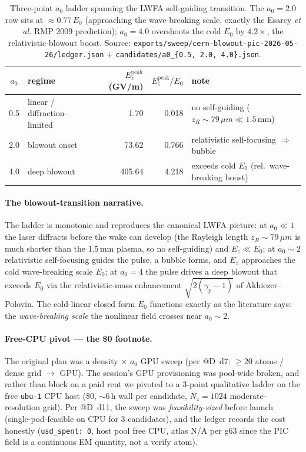 \begin{table}[h]
\centering
\small
\setlength{\tabcolsep}{6pt}
\begin{tabular}{@{}c l r r l@{}}
\toprule
$a_0$ & regime & $E_z^{\text{peak}}$ (GV/m) & $E_z^{\text{peak}}/E_0$ & note \\
\midrule
0.5 & linear / diffraction-limited & 1.70   & 0.018 & no self-guiding ($z_R\!\sim\!79\,\mu m\ll\!1.5$\,mm) \\
2.0 & blowout onset                & 73.62  & 0.766 & relativistic self-focusing $\Rightarrow$ bubble \\
4.0 & deep blowout                 & 405.64 & 4.218 & exceeds cold $E_0$ (rel.\ wave-breaking boost) \\
\bottomrule
\end{tabular}
\caption{Three-point $a_0$ ladder spanning the LWFA self-guiding
transition. The $a_0\!=\!2.0$ row sits at $\approx\!0.77\,E_0$
(approaching the wave-breaking scale, exactly the Esarey \emph{et al.}
RMP 2009 prediction); $a_0\!=\!4.0$ overshoots the cold $E_0$ by
$4.2\times$, the relativistic-blowout boost. Source:
\texttt{exports/sweep/cern-blowout-pic-2026-05-26/ledger.json} +
\texttt{candidates/a0\_\{0.5, 2.0, 4.0\}.json}.}
\label{tab:app-wf-blowout}
\end{table}

\paragraph{The blowout-transition narrative.} The ladder is monotonic and
reproduces the canonical LWFA picture: at $a_0\!\ll\!1$ the laser
diffracts before the wake can develop (the Rayleigh length
$z_R\!\sim\!79\,\mu m$ is much shorter than the 1.5\,mm plasma, so no
self-guiding) and $E_z\!\ll\!E_0$; at $a_0\!\sim\!2$ relativistic
self-focusing guides the pulse, a bubble forms, and $E_z$ approaches the
cold wave-breaking scale $E_0$; at $a_0\!=\!4$ the pulse drives a deep
blowout that exceeds $E_0$ via the relativistic-mass enhancement
$\sqrt{2(\gamma_p\!-\!1)}$ of Akhiezer--Polovin. The cold-linear closed
form $E_0$ functions exactly as the literature says: the
\emph{wave-breaking scale} the nonlinear field crosses near $a_0\!\sim\!2$.

\paragraph{Free-CPU pivot --- the \$0 footnote.} The original plan was a
density$\,\times\,a_0$ GPU sweep (per @D~d7: $\ge\!20$ atoms / dense grid
$\to$ GPU). The session's GPU provisioning was pool-wide broken, and
rather than block on a paid rent we pivoted to a 3-point qualitative
ladder on the free \texttt{ubu-1} CPU host (\$0, $\sim\!6$\,h wall per
candidate, $N_z\!=\!1024$ moderate-resolution grid). Per @D~d11, the
sweep was \emph{feasibility-sized} before launch (single-pod-feasible on
CPU for 3 candidates), and the ledger records the cost honestly
(\texttt{usd\_spent: 0}, host pool free CPU, atlas N/A per g63 since the
PIC field is a continuous EM quantity, not a verify atom).

